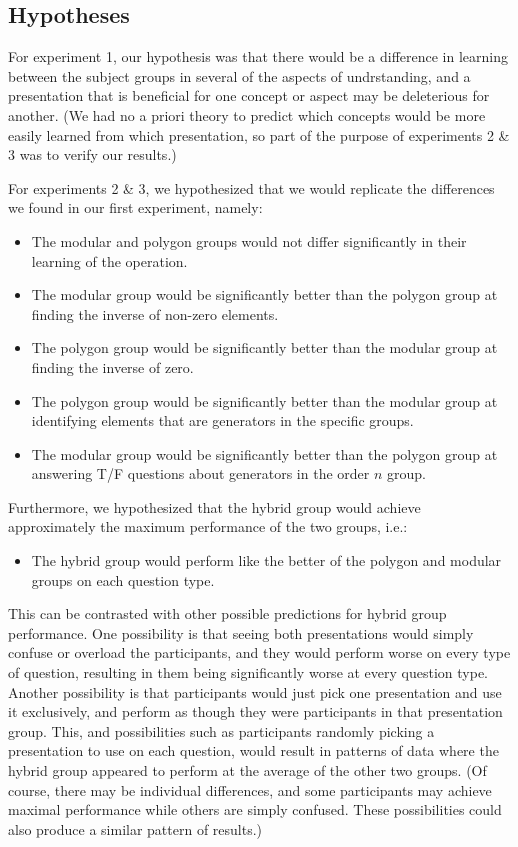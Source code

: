 \documentclass[man,10pt]{apa6}
\begin{document}
\subsection{Hypotheses}
For experiment 1, our hypothesis was that there would be a difference in learning between the subject groups in several of the aspects of undrstanding, and a presentation that is beneficial for one concept or aspect may be deleterious for another. (We had no a priori theory to predict which concepts would be more easily learned from which presentation, so part of the purpose of experiments 2 \& 3 was to verify our results.)\par
For experiments 2 \& 3, we hypothesized that we would replicate the differences we found in our first experiment, namely: 
\begin{itemize} 
\item The modular and polygon groups would not differ significantly in their learning of the operation.
\item The modular group would be significantly better than the polygon group at finding the inverse of non-zero elements.
\item The polygon group would be significantly better than the modular group at finding the inverse of zero.
\item The polygon group would be significantly better than the modular group at identifying elements that are generators in the specific groups.
\item The modular group would be significantly better than the polygon group at answering T/F questions about generators in the order $n$ group.
\end{itemize}
Furthermore, we hypothesized that the hybrid group would achieve approximately the maximum performance of the two groups, i.e.:
\begin{itemize}
\item The hybrid group would perform like the better of the polygon and modular groups on each question type. 
\end{itemize}
This can be contrasted with other possible predictions for hybrid group performance. One possibility is that seeing both presentations would simply confuse or overload the participants, and they would perform worse on every type of question, resulting in them being significantly worse at every question type. Another possibility is that participants would just pick one presentation and use it exclusively, and perform as though they were participants in that presentation group. This, and possibilities such as participants randomly picking a presentation to use on each question, would result in patterns of data where the hybrid group appeared to perform at the average of the other two groups. (Of course, there may be individual differences, and some participants may achieve maximal performance while others are simply confused. These possibilities could also produce a similar pattern of results.) \par
\end{document}
